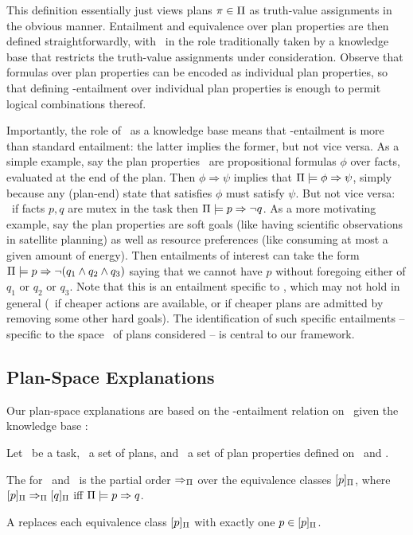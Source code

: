 This definition essentially just views plans $\pi \in \Pi$ as
truth-value assignments in the obvious manner. Entailment and
equivalence over plan properties are then defined straightforwardly,
with \plans\ in the role traditionally taken by a knowledge base that
restricts the truth-value assignments under consideration. Observe
that formulas over plan properties can be encoded as individual plan
properties, so that defining \plans-entailment over individual plan
properties is enough to permit logical combinations thereof.

Importantly, the role of \plans\ as a knowledge base means that
\plans-entailment is more than standard entailment: the latter implies
the former, but not vice versa. As a simple example, say the plan
properties \props\ are propositional formulas $\phi$ over facts,
evaluated at the end of the plan. Then $\phi \Rightarrow \psi$ implies
that $\Pi \models \phi \Rightarrow \psi$, simply because any (plan-end)
state that satisfies $\phi$ must satisfy $\psi$. But not vice versa:
\eg\ if facts $p, q$ are mutex in the task then
$\Pi \models p \Rightarrow \neg q$. As a more motivating example, say the
plan properties are soft goals (like having scientific observations in
satellite planning) as well as resource preferences (like consuming at
most a given amount of energy). Then entailments of interest can take
the form $\Pi \models p \Rightarrow \neg (q_1 \wedge q_2 \wedge q_3)$
saying that we cannot have $p$ without foregoing either of $q_1$ or
$q_2$ or $q_3$. Note that this is an entailment specific to \plans,
which may not hold in general (\eg\ if cheaper actions are available,
or if cheaper plans are admitted by removing some other hard
goals). The identification of such specific entailments -- specific to
the space \plans\ of plans considered -- is central to our framework.





\subsection{Plan-Space Explanations}

Our plan-space explanations are based on the \plans-entailment
relation on \props\ given the knowledge base \plans:

\begin{definition}
Let \task\ be a task, \plans\ a set of plans, and \props\ a set of
plan properties defined on \task\ and \plans.

The  for \plans\ and
\props\ is the partial order $\Rightarrow_{\Pi}$ over the equivalence
classes $[p]_{\Pi}$, where $[p]_{\Pi}
\Rightarrow_{\Pi} [q]_{\Pi}$ iff
$\Pi \models p \Rightarrow q$.

A  replaces each equivalence class
$[p]_{\Pi}$ with exactly one $p \in
[p]_{\Pi}$.
\end{definition}


